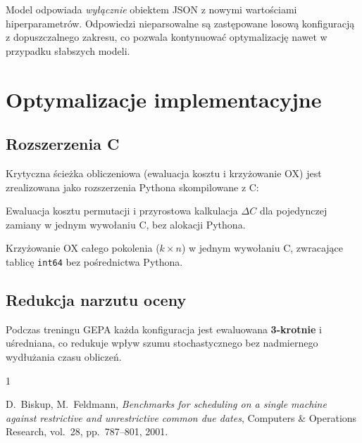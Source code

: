 \documentclass[11pt,a4paper]{article}
\begin{document}
Model odpowiada \emph{wyłącznie} obiektem JSON z nowymi wartościami
hiperparametrów.  Odpowiedzi nieparsowalne są zastępowane losową konfiguracją
z dopuszczalnego zakresu, co pozwala kontynuować optymalizację nawet
w przypadku słabszych modeli.

\section{Optymalizacje implementacyjne}

\subsection{Rozszerzenia C}

Krytyczna ścieżka obliczeniowa (ewaluacja kosztu i krzyżowanie OX) jest
zrealizowana jako rozszerzenia Pythona skompilowane z C:

\begin{description}[style=nextline]
  \item[\texttt{evaluate\_opt.c}]
    Ewaluacja kosztu permutacji i przyrostowa kalkulacja $\Delta C$ dla
    pojedynczej zamiany w jednym wywołaniu C, bez alokacji Pythona.
  \item[\texttt{crossover\_opt.c}]
    Krzyżowanie OX całego pokolenia ($k \times n$) w jednym wywołaniu C,
    zwracające tablicę \texttt{int64} bez pośrednictwa Pythona.
\end{description}

\subsection{Redukcja narzutu oceny}

Podczas treningu GEPA każda konfiguracja jest ewaluowana \textbf{3-krotnie}
i uśredniana, co redukuje wpływ szumu stochastycznego bez nadmiernego
wydłużania czasu obliczeń.

\begin{thebibliography}{1}

D.~Biskup, M.~Feldmann,
\textit{Benchmarks for scheduling on a single machine against restrictive and
unrestrictive common due dates},
Computers \& Operations Research, vol.~28, pp.~787--801, 2001.

\end{thebibliography}
\end{document}
